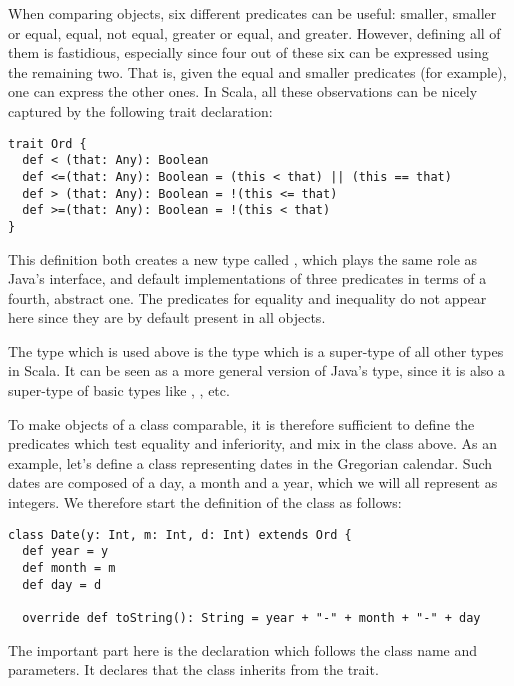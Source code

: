 \documentclass[a4paper,12pt,twoside,titlepage]{article}
\newcommand{\langname}[1]{#1\xspace}
\newcommand{\Scala}{\langname{Scala}}
\newcommand{\Java}{\langname{Java}}
\begin{document}
When comparing objects, six different predicates can be useful:
smaller, smaller or equal, equal, not equal, greater or equal, and
greater. However, defining all of them is fastidious, especially since
four out of these six can be expressed using the remaining two. That
is, given the equal and smaller predicates (for example), one can
express the other ones. In \Scala, all these observations can be
nicely captured by the following trait declaration:
\begin{lstlisting}
trait Ord {
  def < (that: Any): Boolean
  def <=(that: Any): Boolean = (this < that) || (this == that)
  def > (that: Any): Boolean = !(this <= that)
  def >=(that: Any): Boolean = !(this < that)
} 
\end{lstlisting}
This definition both creates a new type called , which
plays the same role as \Java's  interface, and
default implementations of three predicates in terms of a fourth,
abstract one. The predicates for equality and inequality do not appear
here since they are by default present in all objects.

The type  which is used above is the type which is a
super-type of all other types in \Scala. It can be seen as a more
general version of \Java's  type, since it is also a
super-type of basic types like , , etc.

To make objects of a class comparable, it is therefore sufficient to
define the predicates which test equality and inferiority, and mix in
the  class above. As an example, let's define a
 class representing dates in the Gregorian calendar. Such
dates are composed of a day, a month and a year, which we will all
represent as integers. We therefore start the definition of the
 class as follows:
\begin{lstlisting}
class Date(y: Int, m: Int, d: Int) extends Ord {
  def year = y
  def month = m
  def day = d

  override def toString(): String = year + "-" + month + "-" + day
\end{lstlisting}
The important part here is the  declaration which
follows the class name and parameters. It declares that the
 class inherits from the  trait.
\end{document}
